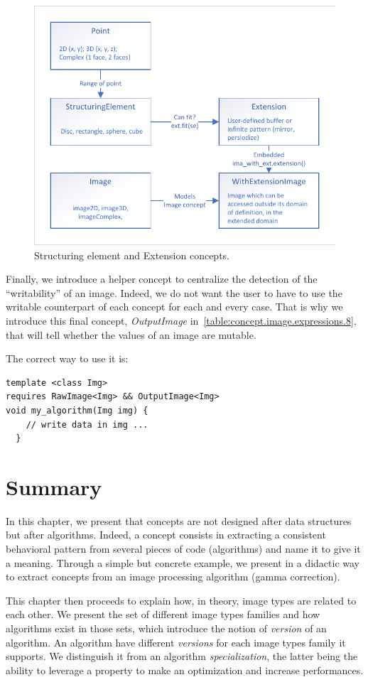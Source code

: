 \begin{figure}[htbp]
  \centering
  \includegraphics[width=.8\linewidth]{../figures/concepts/se_extension}
  \caption{Structuring element and Extension concepts.}
  \label{fig:concept.se_extension}
\end{figure}

Finally, we introduce a helper concept to centralize the detection of the ``writability'' of an image. Indeed, we do not
want the user to have to use the writable counterpart of each concept for each and every case. That is why we introduce
this final concept, \emph{OutputImage} in~\cref{table:concept.image.expressions.8}, that will tell whether the values of
an image are mutable.

The correct way to use it is:
\begin{verbatim}
template <class Img>
requires RawImage<Img> && OutputImage<Img>
void my_algorithm(Img img) {
    // write data in img ...
  }
\end{verbatim}

\section{Summary}

In this chapter, we present that concepts are not designed after data structures but after algorithms. Indeed, a concept
consists in extracting a consistent behavioral pattern from several pieces of code (algorithms) and name it to give it a
meaning. Through a simple but concrete example, we present in a didactic way to extract concepts from an image
processing algorithm (gamma correction).

This chapter then proceeds to explain how, in theory, image types are related to each other. We present the set of
different image types families and how algorithms exist in those sets, which introduce the notion of \emph{version} of
an algorithm. An algorithm have different \emph{versions} for each image types family it supports. We distinguish it
from an algorithm \emph{specialization}, the latter being the ability to leverage a property to make an optimization and
increase performances.

